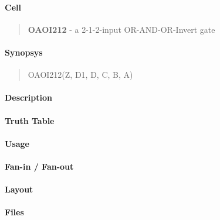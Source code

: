 \label{OAOI212}
\paragraph{Cell}
\begin{quote}
    \textbf{OAOI212} - a 2-1-2-input OR-AND-OR-Invert gate
\end{quote}

\paragraph{Synopsys}
\begin{quote}
    OAOI212(Z, D1, D, C, B, A)
\end{quote}

\paragraph{Description}

%

\paragraph{Truth Table}
%

\paragraph{Usage}

\paragraph{Fan-in / Fan-out}

\paragraph{Layout}

\paragraph{Files}
